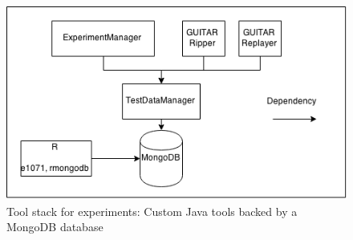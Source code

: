 \begin{figure}
\centering
\includegraphics[]{images/Tools.png}
\caption{Tool stack for experiments: Custom Java tools backed by a MongoDB database}
\end{figure}
